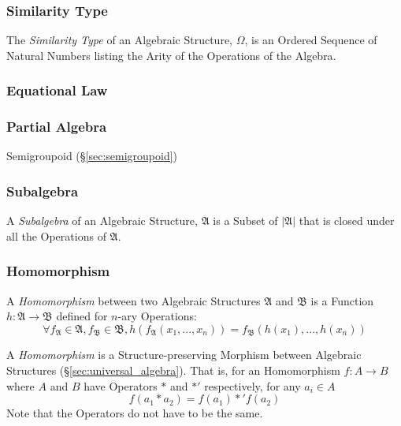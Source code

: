 \subsubsection{Similarity Type}\label{sec:similarity_type}

The \emph{Similarity Type} of an Algebraic Structure, $\Omega$, is an
Ordered Sequence of Natural Numbers listing the Arity of the
Operations of the Algebra.



\subsubsection{Equational Law}\label{sec:equational_law}

\subsubsection{Partial Algebra}\label{sec:partial_algebra}

Semigroupoid (\S\ref{sec:semigroupoid})



\subsubsection{Subalgebra}\label{sec:subalgebra}

A \emph{Subalgebra} of an Algebraic Structure, $\mathfrak{A}$ is a
Subset of $|\mathfrak{A}|$ that is closed under all the Operations of
$\mathfrak{A}$.



\subsubsection{Homomorphism}\label{sec:homomorphism}

A \emph{Homomorphism} between two Algebraic Structures $\mathfrak{A}$
and $\mathfrak{B}$ is a Function $h: \mathfrak{A} \rightarrow
\mathfrak{B}$ defined for $n$-ary Operations:
\[
  \forall f_\mathfrak{A} \in \mathfrak{A}, f_\mathfrak{B} \in
  \mathfrak{B}, h(f_\mathfrak{A}(x_1, ..., x_n)) =
  f_\mathfrak{B}(h(x_1), ..., h(x_n))
\]


A \emph{Homomorphism} is a Structure-preserving Morphism between
Algebraic Structures (\S\ref{sec:universal_algebra}). That is, for
an Homomorphism $f : A \rightarrow B$ where $A$ and $B$ have Operators
$*$ and $*'$ respectively, for any $a_i \in A$
\[
  f(a_1 * a_2) = f(a_1) *' f(a_2)
\]
\fist Note that the Operators do not have to be the same.



